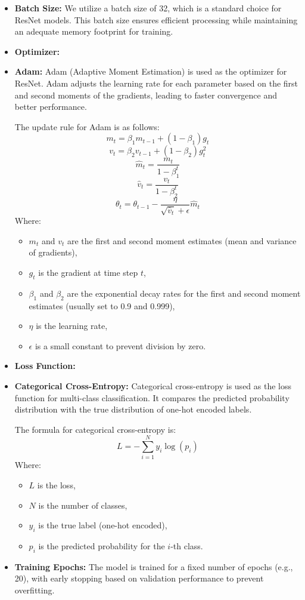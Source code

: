 \documentclass{article}
\begin{document}
\begin{itemize}
    \item \textbf{Batch Size:} We utilize a batch size of 32, which is a standard choice for ResNet models. This batch size ensures efficient processing while maintaining an adequate memory footprint for training.
    \item \textbf{Optimizer:} \item \textbf{Adam:} Adam (Adaptive Moment Estimation) is used as the optimizer for ResNet. Adam adjusts the learning rate for each parameter based on the first and second moments of the gradients, leading to faster convergence and better performance.

    The update rule for Adam is as follows:
    \[
    m_t = \beta_1 m_{t-1} + (1 - \beta_1) g_t
    \]
    \[
    v_t = \beta_2 v_{t-1} + (1 - \beta_2) g_t^2
    \]
    \[
    \hat{m}_t = \frac{m_t}{1 - \beta_1^t}
    \]
    \[
    \hat{v}_t = \frac{v_t}{1 - \beta_2^t}
    \]
    \[
    \theta_t = \theta_{t-1} - \frac{\eta}{\sqrt{\hat{v}_t} + \epsilon} \hat{m}_t
    \]
    Where:
    \begin{itemize}
        \item \( m_t \) and \( v_t \) are the first and second moment estimates (mean and variance of gradients),
        \item \( g_t \) is the gradient at time step \( t \),
        \item \( \beta_1 \) and \( \beta_2 \) are the exponential decay rates for the first and second moment estimates (usually set to 0.9 and 0.999),
        \item \( \eta \) is the learning rate,
        \item \( \epsilon \) is a small constant to prevent division by zero.
    \end{itemize}
    \item \textbf{Loss Function:} \item \textbf{Categorical Cross-Entropy:} Categorical cross-entropy is used as the loss function for multi-class classification. It compares the predicted probability distribution with the true distribution of one-hot encoded labels.

    The formula for categorical cross-entropy is:
    \[
    L = - \sum_{i=1}^{N} y_i \log(p_i)
    \]
    Where:
    \begin{itemize}
        \item \( L \) is the loss,
        \item \( N \) is the number of classes,
        \item \( y_i \) is the true label (one-hot encoded),
        \item \( p_i \) is the predicted probability for the \( i \)-th class.
    \end{itemize}
    \item \textbf{Training Epochs:} The model is trained for a fixed number of epochs (e.g., 20), with early stopping based on validation performance to prevent overfitting.
\end{itemize}
\end{document}
